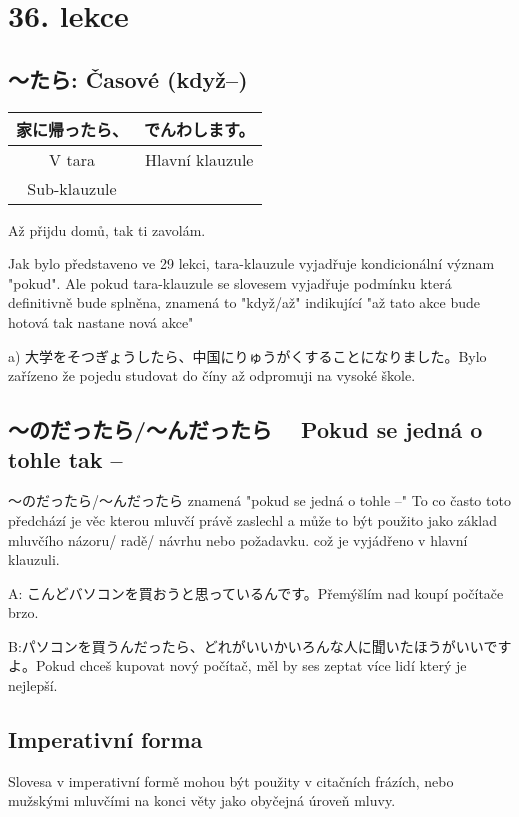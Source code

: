 \section{36. lekce}
\label{sec:lekce_36}

\subsection{〜たら: Časové (když--)}

\begin{center}
\begin{tabular}{||c||c||}
\hline
家に帰ったら、&でんわします。\\
\hline
V tara&Hlavní klauzule\\
\hline
Sub-klauzule&\\
\hline
\end{tabular}
\end{center}

Až přijdu domů, tak ti zavolám.

Jak bylo představeno ve 29 lekci, tara-klauzule vyjadřuje kondicionální význam  "pokud". Ale pokud tara-klauzule se slovesem vyjadřuje podmínku která definitivně bude splněna, znamená to "když/až" indikující "až tato akce bude hotová tak nastane nová akce"

a) 大学をそつぎょうしたら、中国にりゅうがくすることになりました。Bylo zařízeno že pojedu studovat do číny až odpromuji na vysoké škole.


\subsection{〜のだったら/〜んだったら　 Pokud se jedná o tohle tak --}

〜のだったら/〜んだったら znamená "pokud se jedná o tohle --" To co často toto předchází je věc kterou mluvčí právě zaslechl a může to být použito jako základ mluvčího názoru/ radě/ návrhu nebo požadavku. což je vyjádřeno v hlavní klauzuli.


A: こんどバソコンを買おうと思っているんです。Přemýšlím nad koupí počítače brzo.

B:パソコンを買うんだったら、どれがいいかいろんな人に聞いたほうがいいですよ。Pokud chceš kupovat nový počítač, měl by ses zeptat více lidí který je nejlepší.

\subsection{Imperativní forma}
Slovesa v imperativní formě mohou být použity v citačních frázích, nebo mužskými mluvčími na konci věty jako obyčejná úroveň mluvy. 

